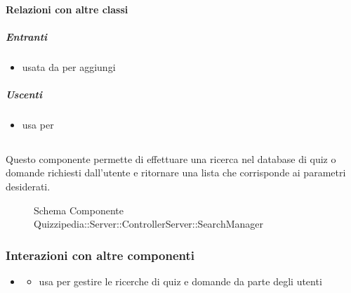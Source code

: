 \paragraph{Relazioni con altre classi}
\subparagraph{Entranti}
\begin{itemize}
\item usata da  per aggiungi
\end{itemize}
\subparagraph{Uscenti}
\begin{itemize}
\item usa  per 
\end{itemize}
\subsection{}
Questo componente permette di effettuare una ricerca nel database di quiz o domande richiesti dall'utente e ritornare una lista che corrisponde ai parametri desiderati.
\begin{figure}[H]
\centering
\noindent{}
\caption[Schema Componente Quizzipedia::Server::ControllerServer::SearchManager]{Schema Componente Quizzipedia::Server::ControllerServer::SearchManager}
\end{figure}
\subsubsection{Interazioni con altre componenti}
\begin{itemize}
\item {}
\begin{itemize}
\item usa  per gestire le ricerche di quiz e domande da parte degli utenti
\end{itemize}
\end{itemize}
